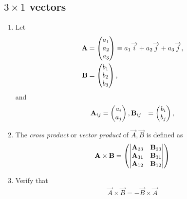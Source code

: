 \documentclass[journal,12pt,twocolumn]{IEEEtran}
\renewcommand\thesection{\arabic{section}}
\renewcommand\thesubsection{\thesection.\arabic{subsection}}
\begin{document}
\subsection{$3\times 1$ vectors}
\renewcommand{\theequation}{\theenumi}
\begin{enumerate}[label=\thesubsection.\arabic*.,ref=\thesubsection.\theenumi]

\item Let 
\begin{align}
  \mathbf{A} &= \begin{pmatrix}a_1\\a_2 \\ a_3\end{pmatrix} \equiv a_1\overrightarrow{i}+a_2\overrightarrow{j}+a_3\overrightarrow{j}, 
  \\
  \mathbf{B} &= \begin{pmatrix}b_1\\b_2 \\ b_3\end{pmatrix}, 
\end{align}
and 
\begin{align}
  \mathbf{A}_{ij} &= \begin{pmatrix}a_i\\a_j\end{pmatrix}, 
  \mathbf{B}_{ij} &= \begin{pmatrix}b_i\\b_j\end{pmatrix}, 
\end{align}

\item The {\em cross product} or {\em vector product} of $\vec{A}, \vec{B}$ is defined as
\begin{align}
  \label{eq:cross3d}
	\mathbf{A} \times \mathbf{B} = \begin{pmatrix} \begin{vmatrix}\mathbf{A}_{23} & \mathbf{B}_{23}\end{vmatrix} \\ \begin{vmatrix}\mathbf{A}_{31} & \mathbf{B}_{31}\end{vmatrix} \\ \begin{vmatrix}\mathbf{A}_{12}  & \mathbf{B}_{12}\end{vmatrix}\end{pmatrix}
\end{align}
\item Verify that
\begin{align}
  \vec{A} \times \vec{B} = -  \vec{B} \times \vec{A} 
\end{align}

\end{enumerate}
\end{document}
